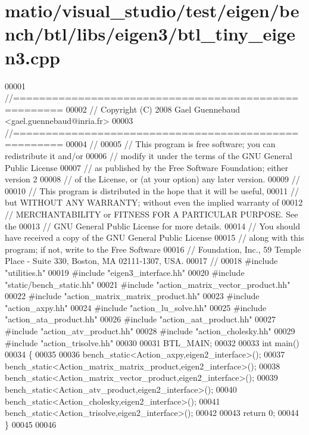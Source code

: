 \hypertarget{matio_2visual__studio_2test_2eigen_2bench_2btl_2libs_2eigen3_2btl__tiny__eigen3_8cpp_source}{}\section{matio/visual\+\_\+studio/test/eigen/bench/btl/libs/eigen3/btl\+\_\+tiny\+\_\+eigen3.cpp}
\label{matio_2visual__studio_2test_2eigen_2bench_2btl_2libs_2eigen3_2btl__tiny__eigen3_8cpp_source}

\begin{DoxyCode}
00001 \textcolor{comment}{//=====================================================}
00002 \textcolor{comment}{// Copyright (C) 2008 Gael Guennebaud <gael.guennebaud@inria.fr>}
00003 \textcolor{comment}{//=====================================================}
00004 \textcolor{comment}{//}
00005 \textcolor{comment}{// This program is free software; you can redistribute it and/or}
00006 \textcolor{comment}{// modify it under the terms of the GNU General Public License}
00007 \textcolor{comment}{// as published by the Free Software Foundation; either version 2}
00008 \textcolor{comment}{// of the License, or (at your option) any later version.}
00009 \textcolor{comment}{//}
00010 \textcolor{comment}{// This program is distributed in the hope that it will be useful,}
00011 \textcolor{comment}{// but WITHOUT ANY WARRANTY; without even the implied warranty of}
00012 \textcolor{comment}{// MERCHANTABILITY or FITNESS FOR A PARTICULAR PURPOSE.  See the}
00013 \textcolor{comment}{// GNU General Public License for more details.}
00014 \textcolor{comment}{// You should have received a copy of the GNU General Public License}
00015 \textcolor{comment}{// along with this program; if not, write to the Free Software}
00016 \textcolor{comment}{// Foundation, Inc., 59 Temple Place - Suite 330, Boston, MA  02111-1307, USA.}
00017 \textcolor{comment}{//}
00018 \textcolor{preprocessor}{#include "utilities.h"}
00019 \textcolor{preprocessor}{#include "eigen3\_interface.hh"}
00020 \textcolor{preprocessor}{#include "static/bench\_static.hh"}
00021 \textcolor{preprocessor}{#include "action\_matrix\_vector\_product.hh"}
00022 \textcolor{preprocessor}{#include "action\_matrix\_matrix\_product.hh"}
00023 \textcolor{preprocessor}{#include "action\_axpy.hh"}
00024 \textcolor{preprocessor}{#include "action\_lu\_solve.hh"}
00025 \textcolor{preprocessor}{#include "action\_ata\_product.hh"}
00026 \textcolor{preprocessor}{#include "action\_aat\_product.hh"}
00027 \textcolor{preprocessor}{#include "action\_atv\_product.hh"}
00028 \textcolor{preprocessor}{#include "action\_cholesky.hh"}
00029 \textcolor{preprocessor}{#include "action\_trisolve.hh"}
00030 
00031 BTL\_MAIN;
00032 
00033 \textcolor{keywordtype}{int} main()
00034 \{
00035 
00036   bench\_static<Action\_axpy,eigen2\_interface>();
00037   bench\_static<Action\_matrix\_matrix\_product,eigen2\_interface>();
00038   bench\_static<Action\_matrix\_vector\_product,eigen2\_interface>();
00039   bench\_static<Action\_atv\_product,eigen2\_interface>();
00040   bench\_static<Action\_cholesky,eigen2\_interface>();
00041   bench\_static<Action\_trisolve,eigen2\_interface>();
00042 
00043   \textcolor{keywordflow}{return} 0;
00044 \}
00045 
00046 
\end{DoxyCode}
